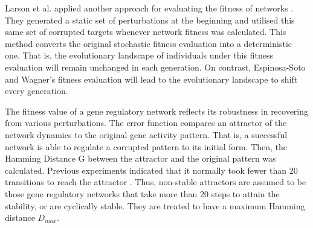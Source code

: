 Larson et al. applied another approach for evaluating the fitness of networks \cite{larson2016hotspot}. They generated a static set of perturbations at the beginning and utilised this same set of corrupted targets whenever network fitness was calculated. This method converts the original stochastic fitness evaluation into a deterministic one. That is, the evolutionary landscape of individuals under this fitness evaluation will remain unchanged in each generation. On contrast, Espinosa-Soto and Wagner's fitness evaluation will lead to the evolutionary landscape to shift every generation. 

The fitness value of a gene regulatory network reflects its robustness in recovering from various perturbations. The error function compares an attractor of the network dynamics to the original gene activity pattern. That is, a successful network is able to regulate a corrupted pattern to its initial form. Then, the Hamming Distance G between the attractor and the original pattern was calculated. Previous experiments indicated that it normally took fewer than 20 transitions to reach the attractor \cite{wagner1996model}. Thus, non-stable attractors are assumed to be those gene regulatory networks that take more than 20 steps to attain the stability, or are cyclically stable. They are treated to have a maximum Hamming distance $D_{max}$. 








